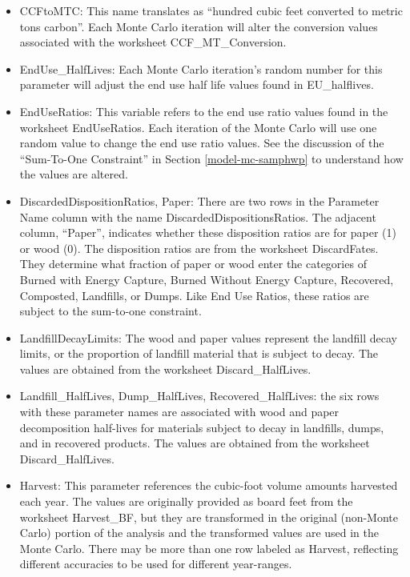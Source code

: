 \documentclass[
]{book}
\begin{document}
\begin{itemize}
  \begin{itemize}
  \item
    CCFtoMTC: This name translates as ``hundred cubic feet converted to metric tons carbon''. Each Monte Carlo iteration will alter the conversion values associated with the worksheet CCF\_MT\_Conversion.
  \item
    EndUse\_HalfLives: Each Monte Carlo iteration's random number for this parameter will adjust the end use half life values found in EU\_halflives.
  \item
    EndUseRatios: This variable refers to the end use ratio values found in the worksheet EndUseRatios. Each iteration of the Monte Carlo will use one random value to change the end use ratio values. See the discussion of the ``Sum-To-One Constraint'' in Section \ref{model-mc-samphwp} to understand how the values are altered.\\
  \item
    DiscardedDispositionRatios, Paper: There are two rows in the Parameter Name column with the name DiscardedDispositionsRatios. The adjacent column, ``Paper'', indicates whether these disposition ratios are for paper (1) or wood (0). The disposition ratios are from the worksheet DiscardFates. They determine what fraction of paper or wood enter the categories of Burned with Energy Capture, Burned Without Energy Capture, Recovered, Composted, Landfills, or Dumps. Like End Use Ratios, these ratios are subject to the sum-to-one constraint.
  \item
    LandfillDecayLimits: The wood and paper values represent the landfill decay limits, or the proportion of landfill material that is subject to decay. The values are obtained from the worksheet Discard\_HalfLives.
  \item
    Landfill\_HalfLives, Dump\_HalfLives, Recovered\_HalfLives: the six rows with these parameter names are associated with wood and paper decomposition half-lives for materials subject to decay in landfills, dumps, and in recovered products. The values are obtained from the worksheet Discard\_HalfLives.
  \item
    Harvest: This parameter references the cubic-foot volume amounts harvested each year. The values are originally provided as board feet from the worksheet Harvest\_BF, but they are transformed in the original (non-Monte Carlo) portion of the analysis and the transformed values are used in the Monte Carlo. There may be more than one row labeled as Harvest, reflecting different accuracies to be used for different year-ranges.\\

\end{itemize}
\end{itemize}
\end{document}
